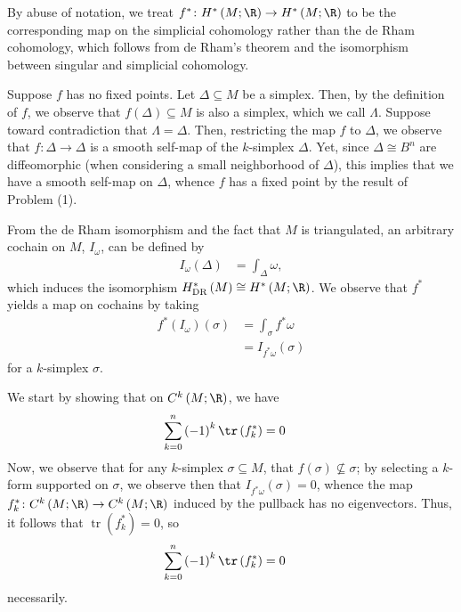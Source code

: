 \documentclass[10pt]{mypackage}
\begin{document}
\begin{solution}
  By abuse of notation, we treat $f^{\ast}\colon H^{\ast}\left( M;\R \right)\rightarrow H^{\ast}\left( M;\R \right)$ to be the corresponding map on the simplicial cohomology rather than the de Rham cohomology, which follows from de Rham's theorem and the isomorphism between singular and simplicial cohomology.\newline

  Suppose $f$ has no fixed points. Let $\Delta\subseteq M$ be a simplex. Then, by the definition of $f$, we observe that $f\left( \Delta \right)\subseteq M$ is also a simplex, which we call $\Lambda$. Suppose toward contradiction that $\Lambda = \Delta$. Then, restricting the map $f$ to $\Delta$, we observe that $f\colon \Delta \rightarrow \Delta$ is a smooth self-map of the $k$-simplex $\Delta$. Yet, since $\Delta\cong B^n$ are diffeomorphic (when considering a small neighborhood of $\Delta$), this implies that we have a smooth self-map on $\Delta$, whence $f$ has a fixed point by the result of Problem (1).\newline

  From the de Rham isomorphism and the fact that $M$ is triangulated, an arbitrary cochain on $M$, $I_{\omega}$, can be defined by
  \begin{align*}
    I_{\omega}\left( \Delta \right) &= \int_{\Delta}^{} \omega,
  \end{align*}
  which induces the isomorphism $H^{\ast}_{\operatorname{DR}}\left( M \right)\cong H^{\ast}\left( M;\R \right)$. We observe that $f^{\ast}$ yields a map on cochains by taking
  \begin{align*}
    f^{\ast}\left( I_{\omega} \right)\left( \sigma \right) &= \int_{\sigma}^{} f^{\ast}\omega\\
                                                           &= I_{f^{\ast}\omega}\left( \sigma \right)
  \end{align*}
  for a $k$-simplex $\sigma$.\newline

  We start by showing that on $C^{k}\left( M;\R \right)$, we have
  \begin{align*}
    \sum_{k=0}^{n} \left( -1 \right)^{k} \tr\left( f_k^{\ast} \right) &= 0
  \end{align*}
  Now, we observe that for any $k$-simplex $\sigma\subseteq M$, that $f\left( \sigma \right)\nsubseteq \sigma$; by selecting a $k$-form supported on $\sigma$, we observe then that $I_{f^{\ast}\omega}\left( \sigma \right) = 0$, whence the map $f_{k}^{\ast}\colon C^{k}\left( M;\R \right)\rightarrow C^{k}\left( M;\R \right)$ induced by the pullback has no eigenvectors. Thus, it follows that $\operatorname{tr}\left( f_k^{\ast} \right) = 0$, so
  \begin{align*}
    \sum_{k=0}^{n} \left( -1 \right)^{k} \tr\left( f_k^{\ast} \right) &= 0
  \end{align*}
  necessarily.\newline


\end{solution}
\end{document}
